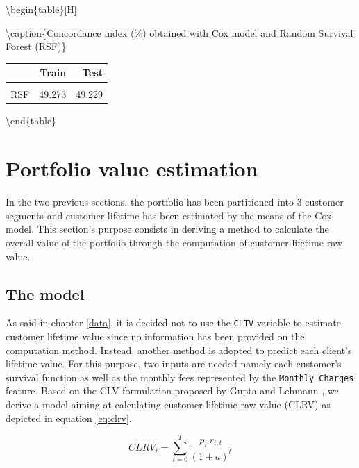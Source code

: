 \documentclass[
]{book}
\begin{document}
\textbackslash begin\{table\}{[}H{]}

\textbackslash caption\{\label{tab:performances}Concordance index (\%) obtained with Cox model and Random Survival Forest (RSF)\}
\centering

\begin{tabular}[t]{lrr}
\toprule
  & Train & Test\\
\midrule
\cellcolor{gray!6}{Cox} & \cellcolor{gray!6}{86.769} & \cellcolor{gray!6}{86.253}\\
RSF & 49.273 & 49.229\\
\bottomrule
\end{tabular}

\textbackslash end\{table\}

\hypertarget{portfolio-value-estimation}{%
\section{Portfolio value estimation}\label{portfolio-value-estimation}}

In the two previous sections, the portfolio has been partitioned into 3 customer segments and customer lifetime has been estimated by the means of the Cox model. This section's purpose consists in deriving a method to calculate the overall value of the portfolio through the computation of customer lifetime raw value.

\hypertarget{the-model}{%
\subsection{The model}\label{the-model}}

As said in chapter \ref{data}, it is decided not to use the \texttt{CLTV} variable to estimate customer lifetime value since no information has been provided on the computation method. Instead, another method is adopted to predict each client's lifetime value. For this purpose, two inputs are needed namely each customer's survival function as well as the monthly fees represented by the \texttt{Monthly\_Charges} feature. Based on the CLV formulation proposed by Gupta and Lehmann \citep{CUSTOMERS_ASSETS}, we derive a model aiming at calculating customer lifetime raw value (CLRV) as depicted in equation \eqref{eq:clrv}.

\begin{equation}
    CLRV_i = \sum_{t=0}^{T} \frac{p_i \ r_{i,t}}{(1+a)^t} 
    \label{eq:clrv}
\end{equation}
\end{document}
